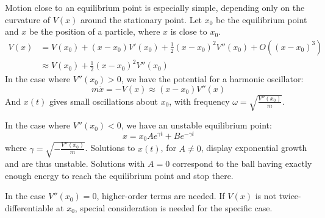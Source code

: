 \documentclass[../Main.tex]{subfiles}
\begin{document}
Motion close to an equilibrium point is especially simple, depending only on the curvature of $V(x)$ around the stationary point. Let $x_0$ be the equilibrium point and $x$ be the position of a particle, where $x$ is close to $x_0$.
\begin{align}
    V(x) &= V(x_0) + (x - x_0)V'(x_0) + \frac{1}{2}(x - x_0)^2 V''(x_0) + O((x - x_0)^3) \nonumber \\
    &\approx V(x_0) + \frac{1}{2}(x - x_0)^2 V''(x_0) \label{eqnStationaryOneDimMotion}
\end{align}
In the case where $V''(x_0) > 0$, we have the potential for a harmonic oscillator:
\begin{equation*}
    m\ddot{x} = -V(x) \approx (x-x_0)V''(x)
\end{equation*}
And $x(t)$ gives small oscillations about $x_0$, with frequency $\omega = \sqrt{\frac{V''(x_0)}{m}}$.\par
In the case where $V''(x_0) < 0$, we have an unstable equilibrium point:
\begin{equation*}
    x = x_0 Ae^{\gamma t} + Be^{-\gamma t}
\end{equation*}
where $\gamma = \sqrt{-\frac{V''(x_0)}{m}}$. Solutions to $x(t)$, for $A \neq 0$, display exponential growth and are thus unstable. Solutions with $A = 0$ correspond to the ball having exactly enough energy to reach the equilibrium point and stop there.\par
In the case $V''(x_0) = 0$, higher-order terms are needed. If $V(x)$ is not twice-differentiable at $x_0$, special consideration is needed for the specific case.
\end{document}
